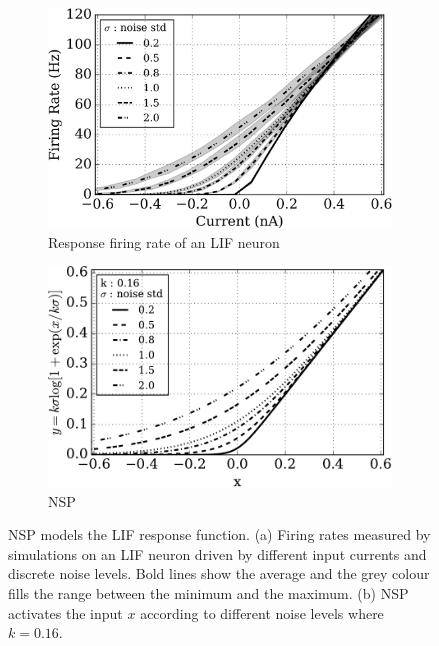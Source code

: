 	\begin{figure}[thb!]
		\centering
		\begin{subfigure}[t]{0.48\textwidth}
			\includegraphics[width=\textwidth]{pics_iconip/siegert.png}
			\caption{Response firing rate of an LIF neuron}
		\end{subfigure}
		\begin{subfigure}[t]{0.48\textwidth}
			\includegraphics[width=\textwidth]{pics_iconip/4.pdf}
			\caption{NSP}
		\end{subfigure}
		\caption{
			NSP models the LIF response function.
			(a) Firing rates measured by simulations on an LIF neuron driven by different input currents and discrete noise levels.
			Bold lines show the average and the grey colour fills the range between the minimum and the maximum.
			(b) NSP activates the input $x$ according to different noise levels where $k=0.16$.}
		\label{fig:nsp}
	\end{figure}
	
